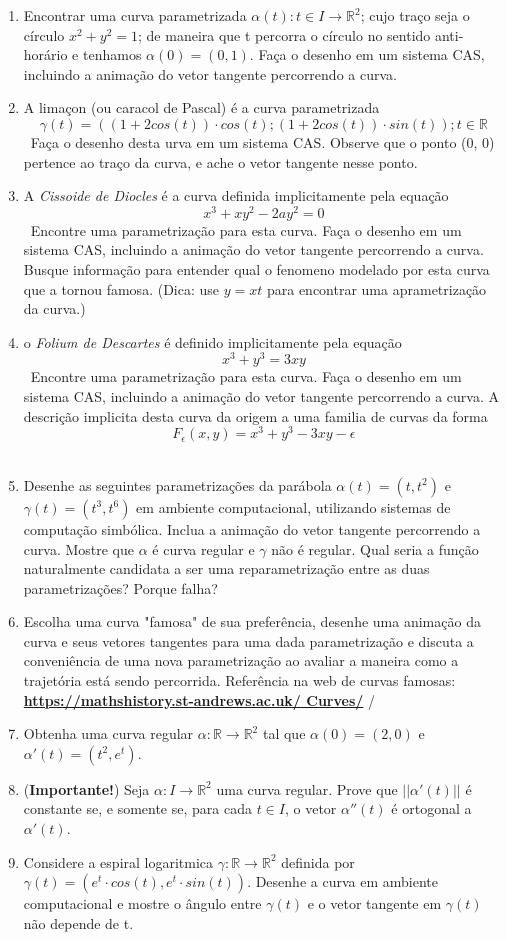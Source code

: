 \documentclass{article}
\begin{document}
\begin{enumerate}
    \item Encontrar uma curva parametrizada $\alpha(t) : t \in I \to \mathbb{R}^2$; cujo traço seja o círculo $x^2 + y^2 = 1$; de maneira que t percorra o círculo no sentido anti-horário e tenhamos $\alpha(0) = (0, 1)$. Faça o desenho em um sistema CAS, incluindo a animação do vetor tangente percorrendo a curva. \
    \item A limaçon (ou caracol de Pascal) é a curva parametrizada \
        $$\gamma(t) = ((1+2cos(t)) \cdot cos(t); (1+2cos(t)) \cdot sin(t)); t \in \mathbb{R}$$ \
        Faça o desenho desta urva em um sistema CAS. Observe que o ponto (0, 0) pertence ao traço da curva, e ache o vetor tangente nesse ponto. \
    \item A \textit{Cissoide de Diocles} é a curva definida implicitamente pela equação \
        $$x^3+xy^2-2ay^2=0$$ \
        Encontre uma parametrização para esta curva. Faça o desenho em um sistema CAS, incluindo a animação do vetor tangente percorrendo a curva. Busque informação para entender qual o fenomeno modelado por esta curva que a tornou famosa. (Dica: use $y = xt$ para encontrar uma aprametrização da curva.) \
    \item o \textit{Folium de Descartes} é definido implicitamente pela equação \
        $$x^3+y^3 = 3xy$$ \
        Encontre uma parametrização para esta curva. Faça o desenho em um sistema CAS, incluindo a animação do vetor tangente percorrendo a curva. A descrição implicita desta curva da origem a uma familia de curvas da forma \
        $$F_{\epsilon}(x, y) = x^3 + y^3 - 3xy - \epsilon$$ \
    \item Desenhe as seguintes parametrizações da parábola $\alpha(t) = (t,t^2)$ e $\gamma(t) = (t^3,t^6)$ em ambiente computacional, utilizando sistemas de computação simbólica. Inclua a animação do vetor tangente percorrendo a curva. Mostre que $\alpha$ é curva regular e $\gamma$ não é regular. Qual seria a função naturalmente candidata a ser uma reparametrização entre as duas parametrizações? Porque falha? \
    \item Escolha uma curva "famosa" de sua preferência, desenhe uma animação da curva e seus vetores tangentes para uma dada parametrização e discuta a conveniência de uma nova parametrização ao avaliar a maneira como a trajetória está sendo percorrida. Referência na web de curvas famosas: \href{https://mathshistory.st-andrews.ac.uk/
    Curves/}{\textbf{https://mathshistory.st-andrews.ac.uk/
    Curves/}} /
    \item Obtenha uma curva regular $\alpha : \mathbb{R} \to \mathbb{R}^2$ tal que $\alpha(0) = (2, 0)$ e $\alpha'(t) = (t^2, e^t)$. \
    \item (\textbf{Importante!}) Seja $\alpha : I \to \mathbb{R}^2$ uma curva regular. Prove que $||\alpha'(t)||$ é constante se, e somente se, para cada $t \in I$, o vetor $\alpha''(t)$ é ortogonal a $\alpha'(t)$. \
    \item Considere a espiral logaritmica $\gamma : \mathbb{R} \to \mathbb{R}^2$ definida por $\gamma(t) = (e^t \cdot cos(t), e^t \cdot sin(t))$. Desenhe a curva em ambiente computacional e mostre o ângulo entre $\gamma(t)$ e o vetor tangente em $\gamma(t)$ não depende de t. \ 
\end{enumerate}
\end{document}

